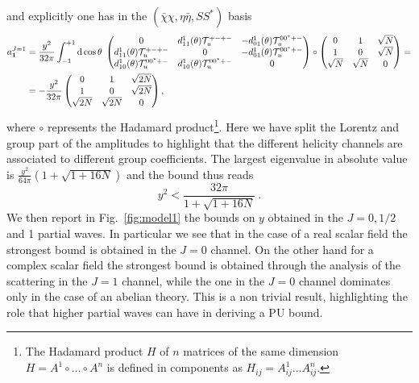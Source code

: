 \documentclass[a4paper,11pt]{article}
\newcommand{\be}{\begin{equation}}
\newcommand{\ee}{\end{equation}}
\newcommand{\nn}{\nonumber}
\begin{document}
and explicitly one has in the $(\bar\chi \chi, \eta\bar\eta, S S^*)$ basis
\begin{align}
\label{eq:model1_j1}
a^{J=1}_{{\bf 1}} & =
\frac{y^2}{32\pi}
 \int_{-1}^{+1}{\rm d}\cos\theta \;
\begin{pmatrix}
0 & d^1_{11}(\theta){\cal{T}}_u^{+-+-} & -d^1_{01}(\theta) {\cal{T}}_u^{00^*+-} \\
d^1_{11}(\theta){\cal{T}}_u^{+-+-}& 0 &  -d^1_{01}(\theta){\cal{T}}_u^{00^*+-} \\
 d^1_{10}(\theta){\cal{T}}_u^{00^*+-} &d^1_{10}(\theta) {\cal{T}}_u^{00^*+-}& 0 \\ 
\end{pmatrix}
\circ
\begin{pmatrix}
0 & 1 & \sqrt N \\
1 & 0 & \sqrt N \\
\sqrt N & \sqrt N & 0
\end{pmatrix} \nn = \\
& =- \frac{y^2}{32\pi}
\begin{pmatrix}
0 & 1 & \sqrt{2N} \\
1 & 0 &  \sqrt{2N} \\
 \sqrt{2N} &  \sqrt{2N} & 0  
\end{pmatrix} , 
\end{align}
where $\circ$ represents the Hadamard product\footnote{The Hadamard product $H$ of $n$ matrices  of the same dimension $H=A^1\circ \ldots \circ A^n$ is defined in components as $H_{ij}=A^1_{ij}\ldots A^n_{ij}$.}. Here we have split the Lorentz and group part of the amplitudes to highlight that the different helicity channels are associated to different group coefficients.
The largest eigenvalue in absolute value is $\frac{y^2}{64\pi}(1+\sqrt{1+16 N})$ and  the bound thus reads
\be\label{eq:model1_J1_complex}
y^2 < \frac{32 \pi}{1+\sqrt{1+16 N}} \ .
\ee
We then report in Fig.~\ref{fig:model1} the bounds on $y$ obtained in the $J=0,1/2$ and 1 partial waves. In particular we see that in the case of a real scalar field the strongest bound is obtained in the $J=0$ channel.
On the other hand for a complex scalar field the strongest bound is obtained through the analysis of the scattering in the $J=1$ channel, while the one in the $J=0$ channel dominates only in the case of an abelian theory. This is a non trivial result, highlighting the role that higher partial waves can have in deriving a PU bound.
\end{document}

